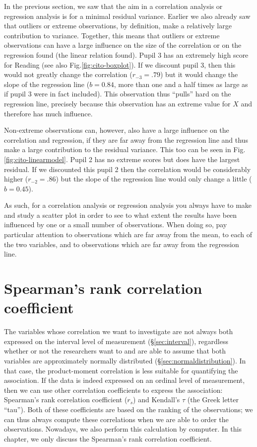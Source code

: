 \documentclass[
]{book}
\begin{document}
In the previous section, we saw that the aim in a correlation analysis
or regression analysis is for a minimal residual variance.
Earlier we also already saw that outliers or extreme observations, by definition,
make a relatively large contribution to variance. Together, this means that
outliers or extreme observations can have a large influence on the size of
the correlation or on the regression found (the linear relation found). Pupil 3 has an
extremely high score for Reading (see also
Fig.\ref{fig:cito-boxplot}). If we discount pupil 3, then this would not greatly
change the correlation (\(r_{-3}=.79\)) but it would change the slope of the regression line
(\(b=0.84\), more than one and a half times as large as if pupil 3 were in fact included).
This observation thus ``pulls'' hard on the regression line, precisely because
this observation has an extreme value for \(X\) and therefore has much influence.

Non-extreme observations can, however, also have a large influence on the
correlation and regression, if they are far away from the regression line
and thus make a large contribution to the residual variance. This too can be seen in
Fig.\ref{fig:cito-linearmodel}.
Pupil 2 has no extreme scores
but does have the largest residual. If we discounted this pupil 2 then the
correlation would be considerably higher
(\(r_{-2}=.86\)) but the slope of the regression line would only
change a little (\(b=0.45\)).

As such, for a correlation analysis or regression analysis you always have
to make and study a scatter plot in order to see to what extent the results
have been influenced by one or a small number of observations. When doing so, pay
particular attention to observations which are far away from the mean, to each
of the two variables, and to observations which are far away from
the regression line.

\hypertarget{sec:Spearman}{%
\section{Spearman's rank correlation coefficient}\label{sec:Spearman}}

The variables whose correlation we want to investigate
are not always both expressed on the interval level of measurement
(§\ref{sec:interval}), regardless whether or not the researchers
want to and are able to assume that both variables are
approximately normally distributed
(§\ref{sec:normaldistribution}).
In that case, the product-moment correlation is less suitable for
quantifying the association. If the data is indeed expressed on an
ordinal level of measurement, then we can use other correlation coefficients
to express the association: Spearman's rank correlation coefficient
(\(r_s\)) and Kendall's \(\tau\) (the Greek letter ``tau''). Both of these coefficients
are based on the ranking of the observations; we can thus always compute these correlations
when we are able to order the observations. Nowadays, we also perform this calculation
by computer. In this chapter, we only discuss the Spearman's rank correlation
coefficient.
\end{document}
